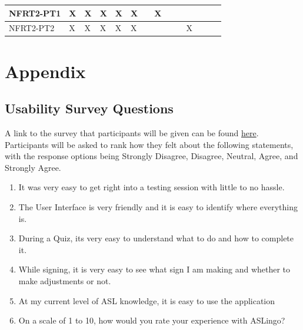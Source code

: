 \documentclass[12pt, titlepage]{article}
\begin{document}
\begin{table}[ht]
{\begin{tabular}{llllllllllllll}
\multicolumn{1}{|l|}{NFRT2-PT1}   & \multicolumn{1}{l|}{X}  & \multicolumn{1}{l|}{X}  & \multicolumn{1}{l|}{X}  & \multicolumn{1}{l|}{X}  & \multicolumn{1}{l|}{X}  & \multicolumn{1}{l|}{}  & \multicolumn{1}{l|}{X}  & \multicolumn{1}{l|}{}  & \multicolumn{1}{l|}{}  & \multicolumn{1}{l|}{}   & \multicolumn{1}{l|}{}  & \multicolumn{1}{l|}{}   & \multicolumn{1}{l|}{}   \\ \hline
\multicolumn{1}{|l|}{NFRT2-PT2}   & \multicolumn{1}{l|}{X}  & \multicolumn{1}{l|}{X}  & \multicolumn{1}{l|}{X}  & \multicolumn{1}{l|}{X}  & \multicolumn{1}{l|}{X}  & \multicolumn{1}{l|}{}  & \multicolumn{1}{l|}{}  & \multicolumn{1}{l|}{}  & \multicolumn{1}{l|}{}  & \multicolumn{1}{l|}{X}   & \multicolumn{1}{l|}{}  & \multicolumn{1}{l|}{}   & \multicolumn{1}{l|}{}   \\ \hline
\end{tabular}}
\end{table}


% 
% 

\newpage{}

\section{Appendix}

\subsection{Usability Survey Questions} \label{appen}

A link to the survey that participants will be given can be found \href{https://docs.google.com/forms/d/e/1FAIpQLSelcMIJ-egkwLc7gO8MhqO35-FpTtQ6efCKnogOOKVVsrdWNA/viewform}{here}. Participants will be asked to rank how they felt about the following statements, with the response options being Strongly Disagree, Disagree, Neutral, Agree, and Strongly Agree. 

\begin{enumerate}
\item It was very easy to get right into a testing session with little to no hassle. 
\item The User Interface is very friendly and it is easy to identify where everything is.
\item During a Quiz, its very easy to understand what to do and how to complete it.
\item While signing, it is very easy to see what sign I am making and whether to make adjustments or not.
\item At my current level of ASL knowledge, it is easy to use the application
\item On a scale of 1 to 10, how would you rate your experience with ASLingo? \newline [ 1 = terrible, 10 = fantastic]
\end{enumerate}
\end{document}
